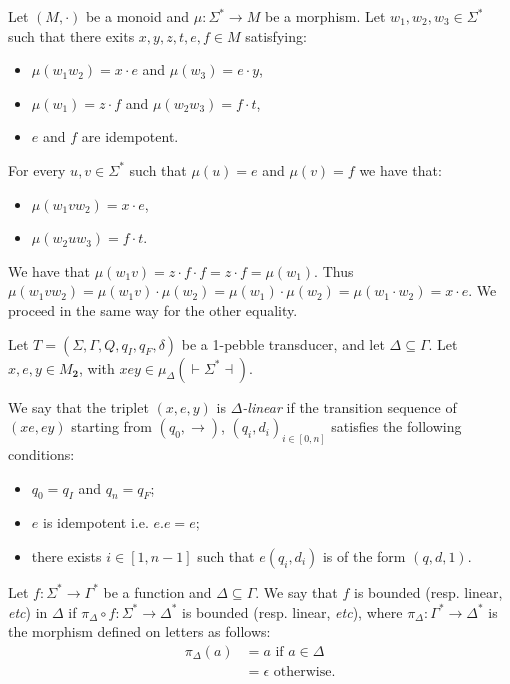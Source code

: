 \begin{lemma}\label{lem:2idem}
Let $(M,\cdot)$ be a monoid and $\mu:\Sigma^*\to M$ be a morphism. Let $w_1,w_2, w_3\in\Sigma^*$ such that there exits $x,y,z,t,e,f\in M$ satisfying:
\begin{itemize}
\item $\mu(w_1w_2)=x\cdot e$ and $\mu(w_3)=e\cdot y$,
\item $\mu(w_1)=z\cdot f$ and $\mu(w_2w_3)=f\cdot t$,
\item $e$ and $f$ are idempotent.
\end{itemize}
For every $u, v\in\Sigma^*$ such that $\mu(u)=e$ and $\mu(v)=f$ we have that:
\begin{itemize}
\item $\mu(w_1vw_2)=x\cdot e$, 
\item $\mu(w_2uw_3)=f\cdot t$.
\end{itemize}
\end{lemma}

\begin{pr}
We have that $\mu(w_1v)=z\cdot f\cdot f=z\cdot f=\mu(w_1)$.
Thus $\mu(w_1vw_2)=\mu(w_1v)\cdot \mu(w_2)=\mu(w_1)\cdot \mu(w_2)=\mu(w_1\cdot w_2) =x\cdot e$.
We proceed in the same way for the other equality.
\end{pr}

\begin{definition}
Let $T=(\Sigma,\Gamma,Q,q_I,q_F, \delta)$ be a 1-pebble transducer, and let $\Delta\subseteq \Gamma$. Let $x, e, y\in M_{\mathbf 2}$, with $xey\in \mu_\Delta( { \vdash}\Sigma^*{ \dashv})$.

We say that the triplet $(x,e,y)$ is \emph{$\Delta$-linear} if the transition sequence of $(xe,ey)$ starting from $(q_0,\rightarrow)$, 
$(q_i,d_i)_{i\in[0,n]}$ satisfies the following conditions:
\begin{itemize}
\item $q_0=q_I$ and $q_n=q_F$;
\item $e$ is idempotent i.e. $e.e=e$;
\item there exists $i\in [1,n-1]$ such that $e(q_i,d_i)$ is of the form $(q,d,1)$.
\end{itemize}
\end{definition}

 \begin{definition}
Let $f:\Sigma^*\to \Gamma^*$ be a function and $\Delta\subseteq\Gamma$. We say that $f$ is bounded (resp. linear, \textit{etc}) in $\Delta$ if $\pi_\Delta\circ f: \Sigma^*\to \Delta^*$ is bounded (resp. linear, \textit{etc}), where $\pi_\Delta:\Gamma^*\to \Delta^*$ is the morphism defined on letters as follows:
\begin{align*}
\pi_\Delta(a)&=a \text{ if }  a\in \Delta \\
&= \epsilon \text{ otherwise.}
\end{align*}
 \end{definition}
 

